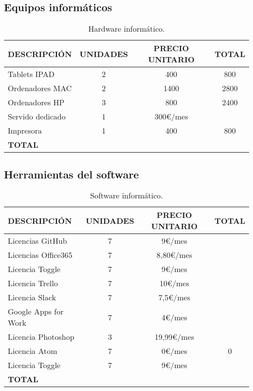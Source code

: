\documentclass[10pt,a4paper,oldfontcommands]{dpds}
\begin{document}
\subsection{Equipos informáticos}
\begin{table}[H]
\begin{center}
\begin{tabular}{l c c c}
\hline
\textbf{DESCRIPCIÓN} & \textbf{UNIDADES} & \textbf{PRECIO UNITARIO} & \textbf{TOTAL}\\ \hline \hline
Tablets IPAD & 2 & 400 & 800\\
Ordenadores MAC & 2 & 1400 & 2800\\
Ordenadores HP & 3 & 800 & 2400\\
Servido dedicado & 1 & 300\euro/mes & \\
Impresora & 1 & 400 & 800\\ \hline \hline
\textbf{TOTAL} & & & \\ \hline
\end{tabular}
\caption{Hardware informático.}
\label{tab:hardware}
\end{center}
\end{table}



\subsection{Herramientas del software}
\begin{table}[H]
\begin{center}
\begin{tabular}{l c c c}
\hline
\textbf{DESCRIPCIÓN} & \textbf{UNIDADES} & \textbf{PRECIO UNITARIO} & \textbf{TOTAL}\\ \hline \hline
Licencias GitHub & 7 & 9\euro/mes & \\
Licencias Office365 & 7 & 8,80\euro/mes & \\
Licencia Toggle & 7 & 9\euro/mes & \\
Licencia Trello & 7 & 10\euro/mes & \\
Licencia Slack & 7 & 7,5\euro/mes & \\
Google Apps for Work & 7 & 4\euro/mes & \\
Licencia Photoshop & 3 & 19,99\euro/mes & \\
Licencia Atom & 7 & 0\euro/mes & 0\\
Licencia Toggle & 7 & 9\euro/mes & \\ \hline \hline
\textbf{TOTAL} & & & \\ \hline
\end{tabular}
\caption{Software informático.}
\label{tab:software}
\end{center}
\end{table}
\end{document}
